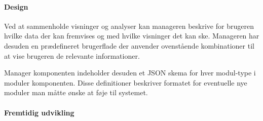 \paragraph{Design}
Ved at sammenholde visninger og analyser kan manageren beskrive for brugeren hvilke data der kan fremvises og med hvilke visninger det kan ske.
Manageren har desuden en prædefineret brugerflade der anvender ovenstående kombinationer til at vise brugeren de relevante informationer.

Manager komponenten indeholder desuden et JSON skema for hver modul-type i moduler komponenten.
Disse definitioner beskriver formatet for eventuelle nye moduler man måtte ønske at føje til systemet.


\paragraph{Fremtidig udvikling}


